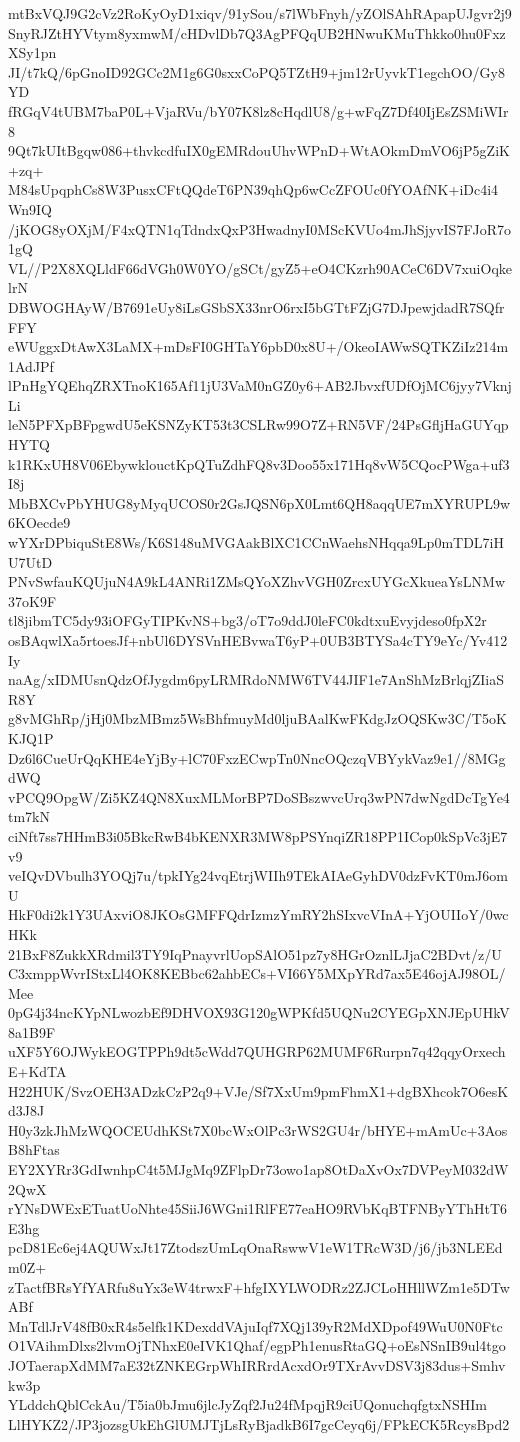 mtBxVQJ9G2cVz2RoKyOyD1xiqv/91ySou/s7lWbFnyh/yZOlSAhRApapUJgvr2j9
SnyRJZtHYVtym8yxmwM/cHDvlDb7Q3AgPFQqUB2HNwuKMuThkko0hu0FxzXSy1pn
JI/t7kQ/6pGnoID92GCc2M1g6G0sxxCoPQ5TZtH9+jm12rUyvkT1egchOO/Gy8YD
fRGqV4tUBM7baP0L+VjaRVu/bY07K8lz8cHqdlU8/g+wFqZ7Df40IjEsZSMiWIr8
9Qt7kUItBgqw086+thvkcdfuIX0gEMRdouUhvWPnD+WtAOkmDmVO6jP5gZiK+zq+
M84sUpqphCs8W3PusxCFtQQdeT6PN39qhQp6wCcZFOUc0fYOAfNK+iDc4i4Wn9IQ
/jKOG8yOXjM/F4xQTN1qTdndxQxP3HwadnyI0MScKVUo4mJhSjyvIS7FJoR7o1gQ
VL//P2X8XQLldF66dVGh0W0YO/gSCt/gyZ5+eO4CKzrh90ACeC6DV7xuiOqkelrN
DBWOGHAyW/B7691eUy8iLsGSbSX33nrO6rxI5bGTtFZjG7DJpewjdadR7SQfrFFY
eWUggxDtAwX3LaMX+mDsFI0GHTaY6pbD0x8U+/OkeoIAWwSQTKZiIz214m1AdJPf
lPnHgYQEhqZRXTnoK165Af11jU3VaM0nGZ0y6+AB2JbvxfUDfOjMC6jyy7VknjLi
leN5PFXpBFpgwdU5eKSNZyKT53t3CSLRw99O7Z+RN5VF/24PsGfljHaGUYqpHYTQ
k1RKxUH8V06EbywklouctKpQTuZdhFQ8v3Doo55x171Hq8vW5CQocPWga+uf3I8j
MbBXCvPbYHUG8yMyqUCOS0r2GsJQSN6pX0Lmt6QH8aqqUE7mXYRUPL9w6KOecde9
wYXrDPbiquStE8Ws/K6S148uMVGAakBlXC1CCnWaehsNHqqa9Lp0mTDL7iHU7UtD
PNvSwfauKQUjuN4A9kL4ANRi1ZMsQYoXZhvVGH0ZrcxUYGcXkueaYsLNMw37oK9F
tl8jibmTC5dy93iOFGyTIPKvNS+bg3/oT7o9ddJ0leFC0kdtxuEvyjdeso0fpX2r
osBAqwlXa5rtoesJf+nbUl6DYSVnHEBvwaT6yP+0UB3BTYSa4cTY9eYc/Yv412Iy
naAg/xIDMUsnQdzOfJygdm6pyLRMRdoNMW6TV44JIF1e7AnShMzBrlqjZIiaSR8Y
g8vMGhRp/jHj0MbzMBmz5WsBhfmuyMd0ljuBAalKwFKdgJzOQSKw3C/T5oKKJQ1P
Dz6l6CueUrQqKHE4eYjBy+lC70FxzECwpTn0NncOQczqVBYykVaz9e1//8MGgdWQ
vPCQ9OpgW/Zi5KZ4QN8XuxMLMorBP7DoSBszwvcUrq3wPN7dwNgdDcTgYe4tm7kN
ciNft7ss7HHmB3i05BkcRwB4bKENXR3MW8pPSYnqiZR18PP1ICop0kSpVc3jE7v9
veIQvDVbulh3YOQj7u/tpkIYg24vqEtrjWIIh9TEkAIAeGyhDV0dzFvKT0mJ6omU
HkF0di2k1Y3UAxviO8JKOsGMFFQdrIzmzYmRY2hSIxvcVInA+YjOUIIoY/0wcHKk
21BxF8ZukkXRdmil3TY9IqPnayvrlUopSAlO51pz7y8HGrOznlLJjaC2BDvt/z/U
C3xmppWvrIStxLl4OK8KEBbc62ahbECs+VI66Y5MXpYRd7ax5E46ojAJ98OL/Mee
0pG4j34ncKYpNLwozbEf9DHVOX93G120gWPKfd5UQNu2CYEGpXNJEpUHkV8a1B9F
uXF5Y6OJWykEOGTPPh9dt5cWdd7QUHGRP62MUMF6Rurpn7q42qqyOrxechE+KdTA
H22HUK/SvzOEH3ADzkCzP2q9+VJe/Sf7XxUm9pmFhmX1+dgBXhcok7O6esKd3J8J
H0y3zkJhMzWQOCEUdhKSt7X0bcWxOlPc3rWS2GU4r/bHYE+mAmUc+3AosB8hFtas
EY2XYRr3GdIwnhpC4t5MJgMq9ZFlpDr73owo1ap8OtDaXvOx7DVPeyM032dW2QwX
rYNsDWExETuatUoNhte45SiiJ6WGni1RlFE77eaHO9RVbKqBTFNByYThHtT6E3hg
pcD81Ec6ej4AQUWxJt17ZtodszUmLqOnaRswwV1eW1TRcW3D/j6/jb3NLEEdm0Z+
zTactfBRsYfYARfu8uYx3eW4trwxF+hfgIXYLWODRz2ZJCLoHHllWZm1e5DTwABf
MnTdlJrV48fB0xR4s5elfk1KDexddVAjuIqf7XQj139yR2MdXDpof49WuU0N0Ftc
O1VAihmDlxs2lvmOjTNhxE0eIVK1Qhaf/egpPh1enusRtaGQ+oEsNSnIB9ul4tgo
JOTaerapXdMM7aE32tZNKEGrpWhIRRrdAcxdOr9TXrAvvDSV3j83dus+Smhvkw3p
YLddchQblCckAu/T5ia0bJmu6jlcJyZqf2Ju24fMpqjR9ciUQonuchqfgtxNSHIm
LlHYKZ2/JP3jozsgUkEhGlUMJTjLsRyBjadkB6I7gcCeyq6j/FPkECK5RcysBpd2
